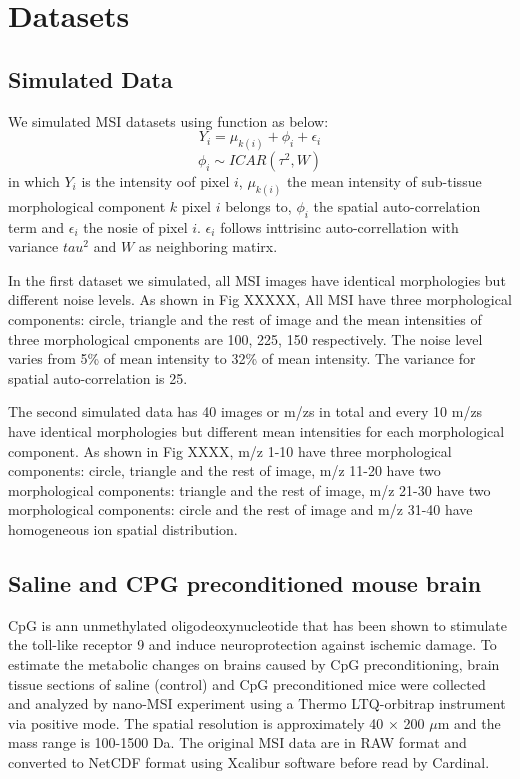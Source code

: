 \documentclass{bioinfo}
\begin{document}
\section{Datasets}

\subsection{Simulated Data}
We simulated MSI datasets using function as below:
$$Y_{i}=\mu_{k(i)}+ \phi_i + \epsilon_i $$
$$ \phi_i  \sim ICAR (\tau^2, W) $$
in which $Y_i$ is the intensity oof pixel $i$, $\mu_{k(i)}$ the mean intensity of sub-tissue morphological component $k$ pixel $i$ belongs to, $\phi_i$ the spatial auto-correlation term and $\epsilon_i$ the nosie of pixel $i$. $\epsilon_i$ follows inttrisinc auto-correllation with variance $tau^2$ and $W$ as neighboring matirx.




In the first dataset we simulated, all MSI images have identical morphologies but different noise levels. As shown in Fig XXXXX, All MSI have three morphological components: circle, triangle and the rest of image and the mean intensities of three morphological cmponents are 100, 225, 150 respectively. The noise level varies from 5\% of mean intensity to 32\% of mean intensity. The variance for spatial auto-correlation is 25.



The second simulated data has 40 images or m/zs in total and every 10 m/zs have identical morphologies but different mean intensities for each morphological component. As shown in Fig XXXX, m/z 1-10 have three morphological components: circle, triangle and the rest of image, m/z 11-20 have two morphological components: triangle and the rest of image, m/z 21-30 have two morphological components: circle and the rest of image and m/z 31-40  have homogeneous ion spatial distribution.

\subsection{Saline and CPG preconditioned mouse brain}
CpG is ann unmethylated oligodeoxynucleotide that has been shown to stimulate the toll-like receptor 9 and induce neuroprotection against ischemic damage. To estimate the metabolic changes on brains caused by CpG preconditioning, brain tissue sections of saline (control) and CpG preconditioned mice were collected and analyzed by nano-MSI experiment using a Thermo LTQ-orbitrap instrument via positive mode. The spatial resolution is approximately 40 $\times$ 200 $\mu$m and the mass range is 100-1500 Da. The original MSI data are in RAW format and converted to NetCDF format using Xcalibur software before read by Cardinal.
\end{document}

